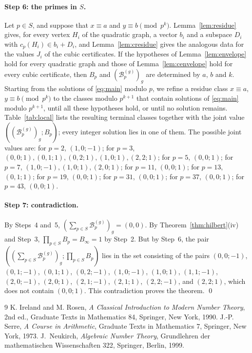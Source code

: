 \documentclass[11pt]{article}
\begin{document}
\paragraph{Step 6: the primes in $S$.} Let $p\in S$, and suppose that $x\equiv a$ and $y\equiv b\pmod{p^k}$. Lemma~\ref{lem:residue} gives, for every vertex $H_i$ of the quadratic graph, a vector $b_i$ and a subspace $D_i$ with $c_p(H_i)\in b_i+D_i$, and Lemma~\ref{lem:cresidue} gives the analogous data for the values $J_i$ of the cubic certificates. If the hypotheses of Lemma~\ref{lem:envelope} hold for every quadratic graph and those of Lemma~\ref{lem:cenvelope} hold for every cubic certificate, then $B_p$ and $(\mathcal B^{(g)}_p)_g$ are determined by $a$, $b$ and $k$. Starting from the solutions of \eqref{eq:main} modulo $p$, we refine a residue class $x\equiv a$, $y\equiv b\pmod{p^k}$ to the classes modulo $p^{k+1}$ that contain solutions of \eqref{eq:main} modulo $p^{k+1}$, until all these hypotheses hold, or until no solution remains. Table~\ref{tab:local} lists the resulting terminal classes together with the joint value $((\mathcal B^{(g)}_p)_g;B_p)$; every integer solution lies in one of them. The possible joint values are: for $p=2$, $(1,0;-1)$; for $p=3$, $(0,0;1),\allowbreak (0,1;1),\allowbreak (0,2;1),\allowbreak (1,0;1),\allowbreak (2,2;1)$; for $p=5$, $(0,0;1)$; for $p=7$, $(1,0;-1),\allowbreak (1,0;1),\allowbreak (2,0;1)$; for $p=11$, $(0,0;1)$; for $p=13$, $(0,1;1)$; for $p=19$, $(0,0;1)$; for $p=31$, $(0,0;1)$; for $p=37$, $(0,0;1)$; for $p=43$, $(0,0;1)$.

\paragraph{Step 7: contradiction.} By Steps~4 and~5, $(\sum_{p\in S}\mathcal B^{(g)}_p)_g=(0,0)$. By Theorem~\ref{thm:hilbert}(iv) and Step~3, $\prod_{p\in S}B_p=B_\infty=1$ by Step~2. But by Step~6, the pair $(\textstyle(\sum_{p\in S}\mathcal B^{(g)}_p)_g;\prod_{p\in S}B_p)$ lies in the set consisting of the pairs $(0,0;-1)$, $(0,1;-1)$, $(0,1;1)$, $(0,2;-1)$, $(1,0;-1)$, $(1,0;1)$, $(1,1;-1)$, $(2,0;-1)$, $(2,0;1)$, $(2,1;-1)$, $(2,1;1)$, $(2,2;-1)$, and $(2,2;1)$, which does not contain $(0,0;1)$. This contradiction proves the theorem.
\qed

\begin{thebibliography}{9}
 K. Ireland and M. Rosen, \emph{A Classical Introduction to Modern Number Theory}, 2nd ed., Graduate Texts in Mathematics 84, Springer, New York, 1990.
 J.-P. Serre, \emph{A Course in Arithmetic}, Graduate Texts in Mathematics 7, Springer, New York, 1973.
 J.~Neukirch, \emph{Algebraic Number Theory}, Grundlehren der mathematischen Wissenschaften 322, Springer, Berlin, 1999.
\end{thebibliography}
\end{document}
